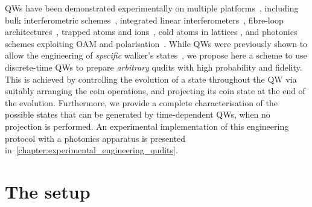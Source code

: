 QWs have been demonstrated experimentally on multiple platforms~\cite{manouchehri2014physical}, including bulk interferometric schemes~\cite{broome2010discrete,kitagawa2012observation,vitelli2013joining}, integrated linear interferometers~\cite{sansoni2012twoparticle, crespi2013anderson, harris2015bosonic, pitsios2016photonic}, fibre-loop architectures~\cite{schreiber2010photons, schreiber2012a, boutari2016large}, trapped atoms and ions~\cite{schmitz2009quantum,karski2009quantum,zhringer2010realization}, cold atoms in lattices \cite{weitenberg2011singlespin, fukuhara2013microscopic, preiss2015strongly}, and photonics schemes exploiting OAM and polarisation~\cite{cardano2015quantum,cardano2016statistical}.
While \acp{QW} were previously shown to allow the engineering of \emph{specific} walker's states~\cite{chandrashekar2008optimizing,majury2018robust}, we propose here a scheme to use discrete-time \acp{QW} to prepare \emph{arbitrary} qudits with high probability and fidelity.
This is achieved by controlling the evolution of a state throughout the QW via suitably arranging the coin operations, and projecting its coin state at the end of the evolution.
Furthermore, we provide a complete characterisation of the possible states that can be generated by time-dependent QWs, when no projection is performed.
An experimental implementation of this engineering protocol with a photonics apparatus is presented in~\cref{chapter:experimental_engineering_qudits}.

\section{The setup}
\label{sec:QWs:setup}

